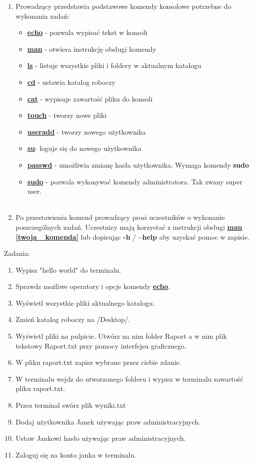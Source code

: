 \documentclass[10pt,a4paper]{article}
\begin{document}
\begin{enumerate}
\item Prowadzący przedstawia podstawowe komendy konsolowe potrzebne do wykonania zadań:
\begin{itemize}
\item \textbf{\underline{echo}} - pozwala wypisać tekst w konsoli
\item \textbf{\underline{man}} - otwiera instrukcję obsługi komendy
\item \textbf{\underline{ls}} - listuje wszystkie pliki i foldery w aktualnym katalogu
\item \textbf{\underline{cd}} - ustawia katalog roboczy
\item \textbf{\underline{cat}} - wypisuje zawartość pliku do konsoli
\item \textbf{\underline{touch}} - tworzy nowe pliki
\item \textbf{\underline{useradd}} - tworzy nowego użytkownika
\item \textbf{\underline{su}}- loguje się do nowego użytkownika
\item \textbf{\underline{passwd}} - umożliwia zmianę hasła użytkownika. Wymaga komendy \textbf{sudo} 
\item \textbf{\underline{sudo}} - pozwala wykonywać komendy administratora. Tak zwany super user.\\\\
\end{itemize}


\item Po przestawieniu komend prowadzący prosi uczestników o wykonanie poszczególnych zadań. Uczestnicy mają korzystać z instrukcji obsługi \textbf{\underline{man [twoja\_ komenda]}} lub dopisując \textbf{-h} / \textbf{--help} aby uzyskać pomoc w zapisie.\\ \end{enumerate}
Zadania:
\begin{enumerate}
\item Wypisz "hello world" do terminalu.
\item Sprawdz możliwe operatory i opcje komendy \textbf{\underline{echo}}.
\item Wyświetl wszystkie pliki aktualnego katalogu.
\item Zmień katalog roboczy na /Desktop/.
\item Wyświetl pliki na pulpicie. Utwórz na nim folder Raport a w nim plik tekstowy Raport.txt przy pomocy interfejsu graficznego.
\item W pliku raport.txt zapisz wybrane przez ciebie zdanie.
\item W terminalu wejdz do utworzonego folderu i wypisz w terminalu zawartość pliku raport.txt.
\item Przez terminal swórz plik wyniki.txt
\item Dodaj użytkownika Janek używając praw administracyjnych.
\item Ustaw Jankowi hasło używając praw administracyjnych.
\item Zaloguj się na konto janka w terminalu.

\end{enumerate}
\end{document}
